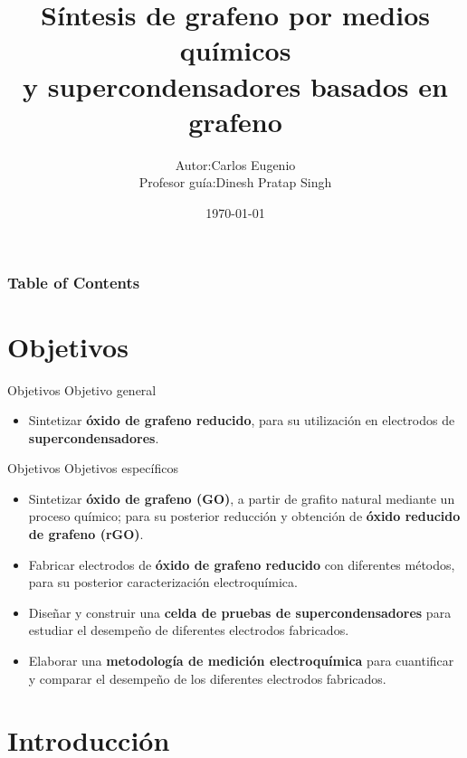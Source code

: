 \documentclass[aspectratio=169]{beamer}
\title{Síntesis de grafeno por medios químicos\\y supercondensadores basados en grafeno}
\date{\today}
\institute{Universidad de Santiago de Chile\\ Laboratorio de Nanosíntesis}
\begin{document}
	\author[Carlos Eugenio]{\begin{tabular}{r@{ }l} 
			Autor:      & Carlos Eugenio \\[1ex] 
			Profesor guía: & Dinesh Pratap Singh
	\end{tabular}}
	\maketitle
	\begin{frame}
		\frametitle{Table of Contents}
		\tableofcontents
	\end{frame}

	\section{Objetivos}
	\begin{frame}{Objetivos}
		Objetivo general
		\begin{itemize}
			\item Sintetizar \textbf{óxido de grafeno reducido}, para su utilización en electrodos de \textbf{supercondensadores}.
		\end{itemize}
	\end{frame}

	\begin{frame}{Objetivos}
		Objetivos específicos
		\begin{itemize}[<+->]
			\item Sintetizar \textbf{óxido de grafeno (GO)}, a partir de grafito natural mediante un proceso químico; para su posterior reducción y obtención de \textbf{óxido reducido de grafeno (rGO)}.
			\item Fabricar electrodos de \textbf{óxido de grafeno reducido} con diferentes métodos, para su posterior caracterización electroquímica.
			\item Diseñar y construir una \textbf{celda de pruebas de supercondensadores} para estudiar el desempeño de diferentes electrodos fabricados.
			\item Elaborar una \textbf{metodología de medición electroquímica} para cuantificar y comparar el desempeño de los diferentes electrodos fabricados. 
		\end{itemize}
	\end{frame}

	\section{Introducción}
\end{document}
